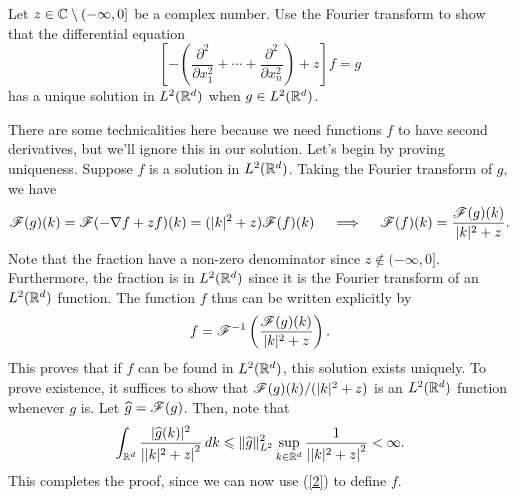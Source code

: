 \documentclass{lkx_pset}
\begin{document}
\begin{problem}{2}
  Let $z\in \mathbb{C}\setminus (-\infty,0]$ be a complex number. Use the Fourier transform to show that the differential equation
  \[
    \left[ -\left(\frac{\partial^2}{\partial x_1^2} + \cdots + \frac{\partial^2}{\partial x_n^2}\right)+z\right]f = g
  \]
  has a unique solution in $L^2(\mathbb{R}^d)$ when $g\in L^2(\mathbb{R}^d)$.
\end{problem}
\begin{solution}
  There are some technicalities here because we need functions $f$ to have second derivatives, but we'll ignore this in our solution. Let's begin by proving uniqueness. Suppose $f$ is a solution in $L^2(\mathbb{R}^d)$. Taking the Fourier transform of $g$, we have
  \begin{equation}
    \mathscr{F}(g)(k) = \mathscr{F}(-\nabla f + zf)(k) = (|k|^2+z)\mathscr{F}(f)(k) \quad\implies\quad \mathscr{F}(f)(k) = \frac{\mathscr{F}(g)(k)}{|k|^2 + z}.
  \end{equation}
  Note that the fraction have a non-zero denominator since $z\notin (-\infty, 0]$. Furthermore, the fraction is in $L^2(\mathbb{R}^d)$ since it is the Fourier transform of an $L^2(\mathbb{R}^d)$ function. The function $f$ thus can be written explicitly by 
  \begin{equation}\label{2}
    f = \mathscr{F}^{-1}\left(\frac{\mathscr{F}(g)(k)}{|k|^2+z}\right).
  \end{equation}
  This proves that if $f$ can be found in $L^2(\mathbb{R}^d)$, this solution exists uniquely. To prove existence, it suffices to show that $\mathscr{F}(g)(k)/(|k|^2+z)$ is an $L^2(\mathbb{R}^d)$ function whenever $g$ is. Let $\widehat{g} = \mathscr{F}(g)$. Then, note that
  \begin{equation}
    \int_{\mathbb{R}^d} \frac{|\widehat{g}(k)|^2}{\left||k|^2+ z\right|^2}\,dk \leqslant \|\widehat{g}\|^2_{L^2}\sup_{k\in \mathbb{R}^d}\frac{1}{\left||k|^2+z\right|^2}<\infty.
  \end{equation}
  This completes the proof, since we can now use (\ref{2}) to define $f$.
\end{solution}
\end{document}
